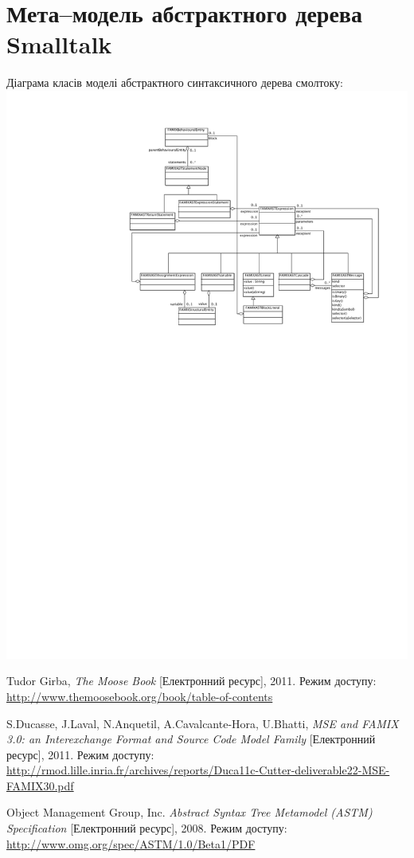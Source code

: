 \documentclass[12pt,a4paper]{article}
\begin{document}
\clearpage

\section{Мета--модель абстрактного дерева Smalltalk}
Діаграма класів моделі абстрактного синтаксичного дерева смолтоку:
\includegraphics[width=\textwidth]{SmalltalkASTClassDiagram}

\clearpage

\begin{thebibliography}{9}

Tudor Girba, \emph{The Moose Book} [Електронний ресурс],
    2011. Режим доступу:
    \url{http://www.themoosebook.org/book/table-of-contents}

S.Ducasse, J.Laval, N.Anquetil, A.Cavalcante-Hora, U.Bhatti, \emph{MSE and FAMIX 3.0: an Interexchange Format and Source Code Model Family} [Електронний ресурс], 2011. Режим доступу:
    \url{http://rmod.lille.inria.fr/archives/reports/Duca11c-Cutter-deliverable22-MSE-FAMIX30.pdf}
    
Object Management Group, Inc. \emph{Abstract Syntax Tree Metamodel (ASTM) Specification} [Електронний ресурс], 2008. Режим доступу:
    \url{http://www.omg.org/spec/ASTM/1.0/Beta1/PDF}

\end{thebibliography}
\end{document}
